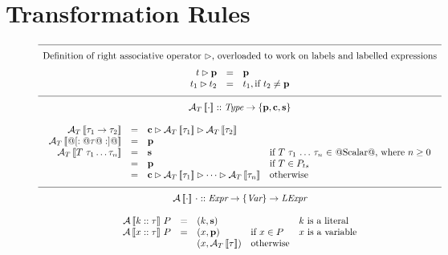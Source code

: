 \section{Transformation Rules}
\label{Section:NewTrafo}

\begin{figure*}
$$\begin{array}{c}
\hline \\[-2mm]
\mbox{Definition of right associative operator \orp, overloaded to work on labels and labelled expressions}\\[2mm]
\begin{array}{rcll}
t \orp \AVP &=& \AVP \\
t_1 \orp t_2    &=& t_1,  \mbox{if $t_2 \neq \AVP$} 
\end{array}
%
\\ \\[-2mm]
\hline \\[-2mm]
%
\mbox{$\AT{\cdot} :: \textit{Type} \to \{\AVP,\AVC,\AVS\}$} \\ \\
\begin{array}{rcll}
\AT{\tau_1 \to \tau_2} & = & \AVC \orp \AT{\tau_1} \orp \AT{\tau_2} \\
\AT{@[:@\tau@:]@}    & = & \AVP  \\
\AT{T~\tau_1 \ldots \tau_n} & = &  \AVS &\mbox{if $T~\tau_1$ $\ldots$ $\tau_n$ $\in$ @Scalar@, where \(n \geq 0\)} \\
     &=& \AVP& \mbox{if $T \in P_{ts}$} \\
     &=& \AVC \orp \AT{\tau_1} \orp \cdots \orp \AT{\tau_n}& \mbox{otherwise}
\end{array} \\ \\[-2mm]
%
\hline \\[-2mm]
%
\mbox{$\AV\cdot\cdot :: \textit{Expr} \to \{\textit{Var}\} \to \textit{LExpr}$} \\ \\
\begin{array}{rcll}
\AV{k::\tau}{P}            & = & (k, \AVS) & \mbox{$k$ is a literal} \\
%       
\AV{x::\tau}{P}            & = & (x, \AVP)       \hspace{3.3em} \mbox{if $x \in P$}  & \mbox{$x$ is a variable}  \\
                           &   & (x, \AT{\tau})  \hspace{1em} \mbox{otherwise} \\

\end{array}
\end{array}$$
\end{figure*}
